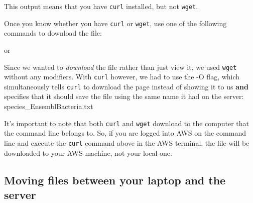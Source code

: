 \documentclass[
  letterpaper,
  DIV=11,
  numbers=noendperiod]{scrreprt}
\newenvironment{Shaded}{\begin{snugshade}}{\end{snugshade}}
\newcommand{\AttributeTok}[1]{\textcolor[rgb]{0.40,0.45,0.13}{#1}}
\newcommand{\CommentTok}[1]{\textcolor[rgb]{0.37,0.37,0.37}{#1}}
\newcommand{\ExtensionTok}[1]{\textcolor[rgb]{0.00,0.23,0.31}{#1}}
\newcommand{\NormalTok}[1]{\textcolor[rgb]{0.00,0.23,0.31}{#1}}
\begin{document}
\begin{Shaded}
\end{Shaded}

This output means that you have \texttt{curl} installed, but not
\texttt{wget}.

Once you know whether you have \texttt{curl} or \texttt{wget}, use one
of the following commands to download the file:

\begin{Shaded}
\end{Shaded}

or

\begin{Shaded}
\end{Shaded}

Since we wanted to \emph{download} the file rather than just view it, we
used \texttt{wget} without any modifiers. With \texttt{curl} however, we
had to use the -O flag, which simultaneously tells \texttt{curl} to
download the page instead of showing it to us \textbf{and} specifies
that it should save the file using the same name it had on the server:
species\_EnsemblBacteria.txt

It's important to note that both \texttt{curl} and \texttt{wget}
download to the computer that the command line belongs to. So, if you
are logged into AWS on the command line and execute the \texttt{curl}
command above in the AWS terminal, the file will be downloaded to your
AWS machine, not your local one.

\subsection{\texorpdfstring{\textbf{Moving files between your laptop and
the
server}}{Moving files between your laptop and the server}}\label{moving-files-between-your-laptop-and-the-server}
\end{document}
